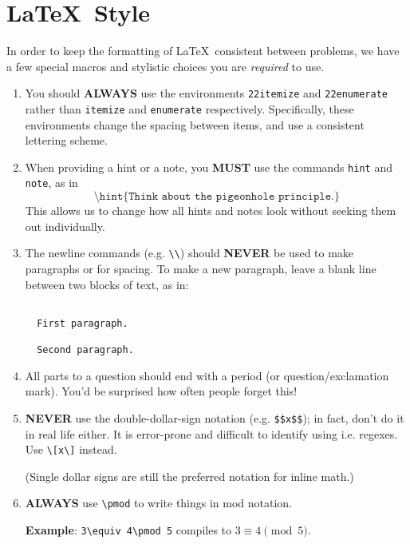 {
\newcommand\comm[1]{\texttt{\textbackslash #1}}

\section{\LaTeX\ Style}
  In order to keep the formatting of \LaTeX\ consistent between problems, we have a few special macros and stylistic choices you are \textit{required} to use.
  
  \begin{enumerate}
    \item You should \textbf{ALWAYS} use the environments \texttt{22itemize} and \texttt{22enumerate} rather than \texttt{itemize} and \texttt{enumerate} respectively. Specifically, these environments change the spacing between items, and use a consistent lettering scheme.
    \item When providing a hint or a note, you \textbf{MUST} use the commands \texttt{hint} and \texttt{note}, as in \[\texttt{\textbackslash hint\{Think about the pigeonhole principle.\}}\] This allows us to change how all hints and notes look without seeking them out individually.
    \item The newline commands (e.g. \texttt{\textbackslash\textbackslash}) should \textbf{NEVER} be used to make paragraphs or for spacing. To make a new paragraph, leave a blank line between two blocks of text, as in: \begin{verbatim}

  First paragraph.
  
  Second paragraph.

    \end{verbatim}
    \item All parts to a question should end with a period (or question/exclamation mark). You'd be surprised how often people forget this!
    \item \textbf{NEVER} use the double-dollar-sign notation (e.g. \texttt{\$\$x\$\$}); in fact, don't do it in real life either. It is error-prone and difficult to identify using i.e. regexes. Use \texttt{\textbackslash[x\textbackslash]} instead.
    
    (Single dollar signs are still the preferred notation for inline math.)
    \item \textbf{ALWAYS} use \comm{pmod} to write things in mod notation. 
      
      \textbf{Example}: \texttt{3\comm{equiv} 4\comm{pmod} 5} compiles to $3\equiv 4\pmod 5$.
      

\end{enumerate}}
